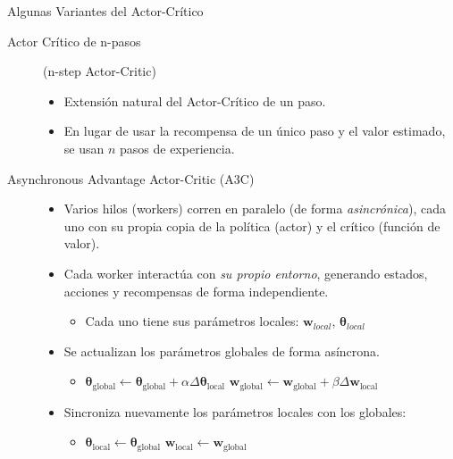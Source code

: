 \documentclass[10pt, envcountsect, handout, aspectratio=1610, hyperref={hypertexnames=true}]{beamer}
\begin{document}
\begin{frame}{Algunas Variantes del Actor-Crítico} \nocite{weng2018policy}
	\begin{description}
		\item[Actor Crítico de n-pasos] (n-step Actor-Critic) \citep{Sutton2018}
		\begin{itemize}
			\item Extensión natural del Actor-Crítico de un paso.
			\item En lugar de usar la recompensa de un único paso y el valor estimado, se usan $n$ pasos de experiencia.
			
		\end{itemize}

		\item [Asynchronous Advantage Actor-Critic (A3C)] \citep{mnih2016asynchronous}
		\begin{itemize}
			\item Varios hilos (workers) corren en paralelo (de forma \emph{asincrónica}), cada uno con su propia copia de la política (actor) y el crítico (función de valor).
			\item Cada worker interactúa con \emph{su propio entorno}, generando estados, acciones y recompensas de forma independiente.
				\begin{itemize}
					\item Cada uno tiene sus parámetros locales: $\mathbf{w}_{local}$, $\bm{\theta}_{local}$
				\end{itemize}
			\item Se actualizan los parámetros globales de forma asíncrona.
				\begin{itemize}
					\item $\bm{\theta}_{\text{global}} \leftarrow \bm{\theta}_{\text{global}} + \alpha \Delta \bm{\theta}_{\text{local}}$
					\qquad
					$\mathbf{w}_{\text{global}} \leftarrow \mathbf{w}_{\text{global}} + \beta \Delta \mathbf{w}_{\text{local}}$
				\end{itemize}
			\item Sincroniza nuevamente los parámetros locales con los globales:
				\begin{itemize}
					\item $\bm{\theta}_{\text{local}} \leftarrow \bm{\theta}_{\text{global}}$
					\qquad
					$\mathbf{w}_{\text{local}} \leftarrow \mathbf{w}_{\text{global}}$
				\end{itemize}
		\end{itemize}


\end{description}
\end{frame}
\end{document}
